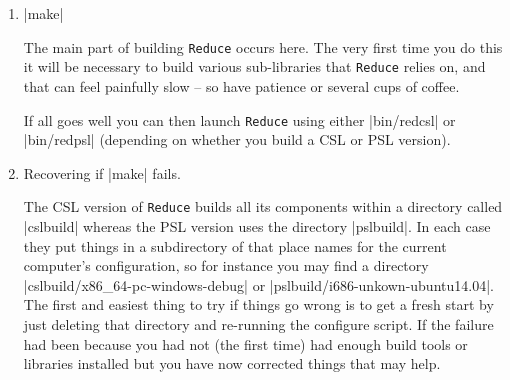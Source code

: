 \documentclass[12pt,twoside,openright]{memoir}
\newcommand{\reduce}{\texttt{Reduce}\xspace}
\begin{document}
\begin{enumerate}
Running the configure script with |--help| should list all the options it
is aware of, but please do not randomly try obscure combinations of options --
some may be little more than traces of earlier experiments.

Note that merely running the configuration script can take a minute or two (and
substantially longer on Windows), and that if you do not have all the necessary
development libraries installed it could fail in a way that may initially
appear obscure. In addition of the previously mentioned |csl-sanity-check.sh|
script please look in the log file(s) that configure
creates\footnote{principally any file called \texttt{config.log} in any part of
  the tree of build directories} and look for evidence of missing header files
or libraries. Install them and try again!

In general you only need to run configure once when you first install
the \reduce sources. On subsequent occasions and even after use of
``|svn update|'' to refresh things you can omit this step.

\item |make|

The main part of building \reduce occurs here. The very first time you do
this it will be necessary to build various sub-libraries that \reduce
relies on, and that can feel painfully slow -- so have patience or several
cups of coffee.

If all goes well you can then launch \reduce using  either |bin/redcsl| or
|bin/redpsl| (depending on whether you build a CSL or PSL version).

\item Recovering if |make| fails.

The CSL version of \reduce builds all its components within a directory called
|cslbuild| whereas the PSL version uses the directory |pslbuild|. In
each case they put things in a subdirectory of that place names for the
current computer's configuration, so for instance you may
find a directory |cslbuild/x86_64-pc-windows-debug| or
|pslbuild/i686-unkown-ubuntu14.04|. The first and easiest thing to
try if things go wrong is to get a fresh start by just deleting that
directory and re-running the configure script. If the failure had been
because you had not (the first time) had enough build tools or libraries
installed but you have now corrected things that may help.


\end{enumerate}
\end{document}
